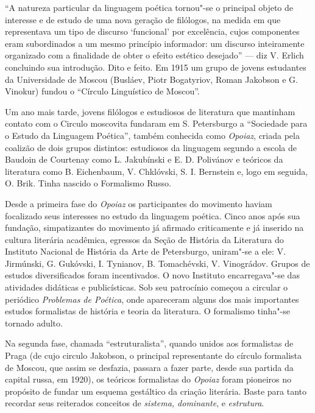 ``A natureza particular da linguagem poética tornou"-se o principal
objeto de interesse e de estudo de uma nova geração de filólogos, na
medida em que representava um tipo de discurso `funcional' por
excelência, cujos componentes eram subordinados a um mesmo princípio
informador: um discurso inteiramente organizado com a finalidade de
obter o efeito estético desejado'' --- diz V. Erlich concluindo sua
introdução. Dito e feito. Em 1915 um grupo de jovens estudantes da
Universidade de Moscou (Busláev, Piotr Bogatyriov, Roman Jakobson e G.
Vinokur) fundou o ``Círculo Linguístico de Moscou''.

Um ano mais tarde, jovens filólogos e estudiosos de literatura que
mantinham contato com o Circulo moscovita fundaram em S. Petersburgo a
``Sociedade para o Estudo da Linguagem Poética'', também conhecida como
\emph{Opoiaz}, criada pela coalizão de dois grupos distintos: estudiosos
da linguagem segundo a escola de Baudoin de Courtenay como L. Jakubínski
e E. D. Polivánov e teóricos da literatura como B. Eichenbaum, V.
Chklóvski, S. I. Bernstein e, logo em seguida, O. Brik. Tinha
nascido o Formalismo Russo.

Desde a primeira fase do \emph{Opoiaz} os participantes do movimento
haviam focalizado seus interesses no estudo da linguagem poética. Cinco
anos após sua fundação, simpatizantes do movimento já afirmado
criticamente e já inserido na cultura literária acadêmica, egressos da
Seção de História da Literatura do Instituto Nacional de História da
Arte de Petersburgo, uniram"-se a ele: V. Jirmúnski, G. Gukóvski, I.
Tynianov, B. Tomachévski, V. Vinográdov. Grupos de estudos
diversificados foram incentivados. O novo Instituto encarregava"-se das
atividades didáticas e publicísticas. Sob seu patrocínio começou a
circular o periódico \emph{Problemas de Poética}, onde apareceram alguns
dos mais importantes estudos formalistas de história e teoria da
literatura. O formalismo tinha"-se tornado adulto.

Na segunda fase, chamada ``estruturalista'', quando unidos aos
formalistas de Praga (de cujo circulo Jakobson, o principal
representante do círculo formalista de Moscou, que assim se desfazia,
passara a fazer parte, desde sua partida da capital russa, em 1920), os
teóricos formalistas do \emph{Opoiaz} foram pioneiros no propósito de
fundar um esquema gestáltico da criação literária. Baste para tanto
recordar seus reiterados conceitos de \emph{sistema, dominante}, e
\emph{estrutura}.

